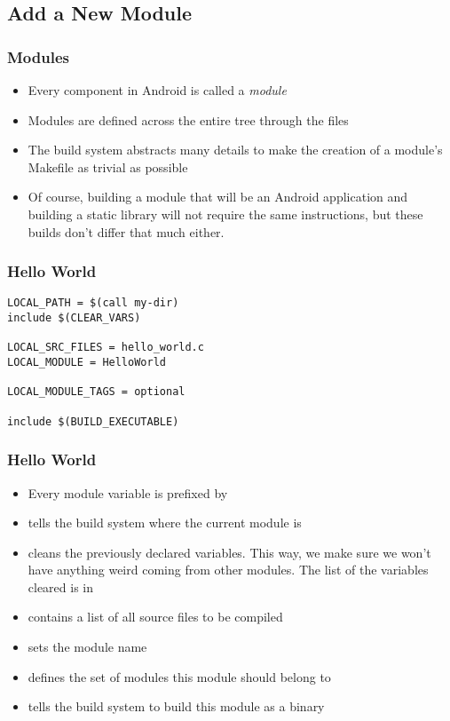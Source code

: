 \subsection{Add a New Module}

\begin{frame}
  \frametitle{Modules}
  \begin{itemize}
  \item Every component in Android is called a \emph{module}
  \item Modules are defined across the entire tree through the
     files
  \item The build system abstracts many details to make the
    creation of a module's Makefile as trivial as possible
  \item Of course, building a module that will be an Android
    application and building a static library will not require the same
    instructions, but these builds don't differ that much either.
  \end{itemize}
\end{frame}

\begin{frame}[fragile]
  \frametitle{Hello World}
\begin{verbatim}
LOCAL_PATH = $(call my-dir)
include $(CLEAR_VARS)

LOCAL_SRC_FILES = hello_world.c
LOCAL_MODULE = HelloWorld

LOCAL_MODULE_TAGS = optional

include $(BUILD_EXECUTABLE)
\end{verbatim}
\end{frame}

\begin{frame}
  \frametitle{Hello World}
  \begin{itemize}
  \item Every module variable is prefixed by 
  \item {} tells the build system where the current
    module is
  \item {} cleans the previously declared
     variables. This way, we make sure we won't have
    anything weird coming from other modules. The list of the
    variables cleared is in 
  \item {} contains a list of all source
    files to be compiled
  \item {} sets the module name
  \item {} defines the set of modules this module
    should belong to
  \item {} tells the build system to
    build this module as a binary
  \end{itemize}
\end{frame}

